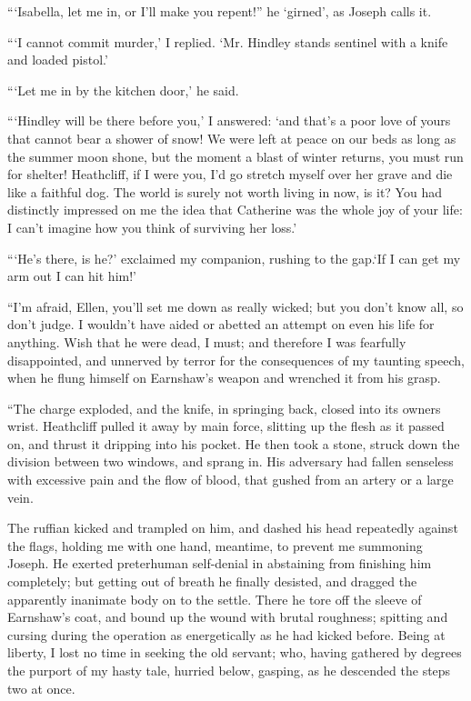 \par “‘Isabella, let me in, or I'll make you repent!” he ‘girned', as Joseph calls it.
\par “‘I cannot commit murder,’ I replied. ‘Mr. Hindley stands sentinel with a knife and loaded pistol.’
\par “‘Let me in by the kitchen door,’ he said.
\par “‘Hindley will be there before you,’ I answered: ‘and that's a poor love of yours that cannot bear a shower of snow! We were left at peace on our beds as long as the summer moon shone, but the moment a blast of winter returns, you must run for shelter! Heathcliff, if I were you, I'd go stretch myself over her grave and die like a faithful dog. The world is surely not worth living in now, is it? You had distinctly impressed on me the idea that Catherine was the whole joy of your life: I can't imagine how you think of surviving her loss.’
\par “‘He's there, is he?’ exclaimed my companion, rushing to the gap.‘If I can get my arm out I can hit him!’
\par “I'm afraid, Ellen, you'll set me down as really wicked; but you don't know all, so don't judge. I wouldn't have aided or abetted an attempt on even his life for anything. Wish that he were dead, I must; and therefore I was fearfully disappointed, and unnerved by terror for the consequences of my taunting speech, when he flung himself on Earnshaw's weapon and wrenched it from his grasp.
\par “The charge exploded, and the knife, in springing back, closed into its owners wrist. Heathcliff pulled it away by main force, slitting up the flesh as it passed on, and thrust it dripping into his pocket. He then took a stone, struck down the division between two windows, and sprang in. His adversary had fallen senseless with excessive pain and the flow of blood, that gushed from an artery or a large vein.
\par The ruffian kicked and trampled on him, and dashed his head repeatedly against the flags, holding me with one hand, meantime, to prevent me summoning Joseph. He exerted preterhuman self-denial in abstaining from finishing him completely; but getting out of breath he finally desisted, and dragged the apparently inanimate body on to the settle. There he tore off the sleeve of Earnshaw's coat, and bound up the wound with brutal roughness; spitting and cursing during the operation as energetically as he had kicked before. Being at liberty, I lost no time in seeking the old servant; who, having gathered by degrees the purport of my hasty tale, hurried below, gasping, as he descended the steps two at once.
